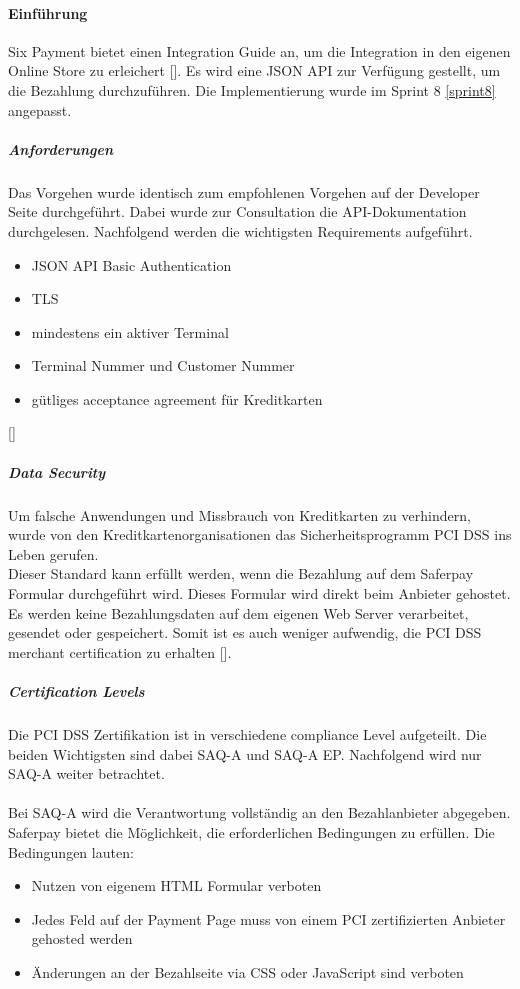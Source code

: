 \paragraph{Einführung}
Six Payment bietet einen Integration Guide an, um die Integration in den eigenen Online Store zu erleichert [\cite{sixECommerce}]. Es wird eine JSON API zur Verfügung gestellt, um die Bezahlung durchzuführen. 
Die Implementierung wurde im Sprint 8 \ref{sprint8} angepasst. 
\subparagraph{Anforderungen}
Das Vorgehen wurde identisch zum empfohlenen Vorgehen auf der Developer Seite durchgeführt. Dabei wurde zur Consultation die \ac{API}-Dokumentation durchgelesen. Nachfolgend werden die wichtigsten Requirements aufgeführt. 
\begin{itemize}
	\item JSON API Basic Authentication
	\item TLS 
	\item mindestens ein aktiver Terminal
	\item Terminal Nummer und Customer Nummer
	\item gütliges acceptance agreement für Kreditkarten
\end{itemize} 
[\cite{jsonAPISix}]
\subparagraph{Data Security}
Um falsche Anwendungen und Missbrauch von Kreditkarten zu verhindern, wurde von den Kreditkartenorganisationen das Sicherheitsprogramm \ac{PCI DSS} ins Leben gerufen. \\
Dieser Standard kann erfüllt werden, wenn die Bezahlung auf dem Saferpay Formular durchgeführt wird. Dieses Formular wird direkt beim Anbieter gehostet. Es werden keine Bezahlungsdaten auf dem eigenen Web Server verarbeitet, gesendet oder gespeichert. Somit ist es auch weniger aufwendig, die \glqq PCI DSS merchant certification\grqq{} zu erhalten [\cite{jsonAPISix}]. 

\subparagraph{Certification Levels}
Die \ac{PCI DSS} Zertifikation ist in verschiedene compliance Level aufgeteilt. Die beiden Wichtigsten sind dabei \ac{SAQ}-A und \ac{SAQ}-A EP. Nachfolgend wird nur \ac{SAQ}-A weiter betrachtet. \\\\
Bei \ac{SAQ}-A wird die Verantwortung vollständig an den Bezahlanbieter abgegeben. Saferpay bietet die Möglichkeit, die erforderlichen Bedingungen zu erfüllen. Die Bedingungen lauten: 
\begin{itemize}
	\item Nutzen von eigenem HTML Formular verboten
	\item Jedes Feld auf der Payment Page muss von einem PCI zertifizierten Anbieter gehosted werden
	\item Änderungen an der Bezahlseite via CSS oder JavaScript sind verboten
\end{itemize}

